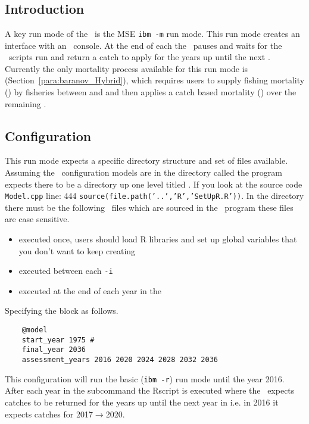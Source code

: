 \section{\label{sec:mse-section}}

\subsection{Introduction}
A key run mode of the \IBM\ is the MSE \texttt{ibm -m} run mode. This run mode creates an interface with an \R\ console. At the end of each  the \IBM\ pauses and waits for the \R\ scripts run and return a catch to apply for the years up until the next . Currently the only mortality process available for this run mode is  (Section~\ref{para:baranov_Hybrid}), which requires users to supply fishing mortality () by fisheries between  and  and then applies a catch based mortality () over the remaining . 

\subsection{Configuration}
This run mode expects a specific directory structure and set of files available. Assuming the \IBM\ configuration models are in the directory called  the program expects there to be a directory up one level titled . If you look at the source code \texttt{Model.cpp} line: 444 \texttt{source(file.path('..','R','SetUpR.R'))}. In the  directory there must be the following \R\ files which are sourced in the \IBM\ program these files are case sensitive.
\begin{itemize}
	\item {} executed once, users should load R libraries and set up global variables that you don't want to keep creating
	\item {} executed between each \texttt{-i} 
	\item {} executed at the end of each year in the 
\end{itemize}

Specifying the  block as follows.
{\small{\begin{verbatim}
	@model
	start_year 1975 # 
	final_year 2036
	assessment_years 2016 2020 2024 2028 2032 2036
\end{verbatim}}}
This configuration will run the basic (\texttt{ibm -r}) run mode until the year 2016. After each year in the  subcommand the Rscript  is executed where the \IBM\ expects catches to be returned for the years up until the next year in   i.e. in 2016 it expects catches for 2017$\rightarrow$2020.


